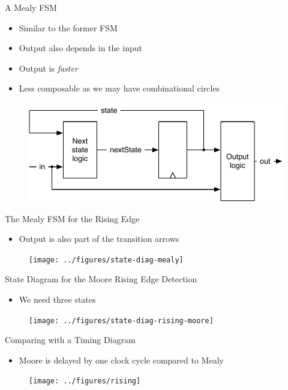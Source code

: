\begin{frame}[fragile]{A Mealy FSM}
\begin{itemize}
\item Similar to the former FSM
\item Output also depends in the input
\item Output is \emph{faster}
\item Less composable as we may have combinational circles
\end{itemize}
\begin{figure}
  \includegraphics[scale=\scale]{../figures/mealy}
\end{figure}
\end{frame}

\begin{frame}[fragile]{The Mealy FSM for the Rising Edge}
\begin{itemize}
\item Output is also part of the transition arrows
\end{itemize}
\begin{figure}
  \texttt{[image: ../figures/state-diag-mealy]}
\end{figure}
\end{frame}

\begin{frame}[fragile]{State Diagram for the Moore Rising Edge Detection}
\begin{itemize}
\item We need three states
\end{itemize}
\begin{figure}
  \texttt{[image: ../figures/state-diag-rising-moore]}
\end{figure}
\end{frame}

\begin{frame}[fragile]{Comparing with a Timing Diagram}
\begin{itemize}
\item Moore is delayed by one clock cycle compared to Mealy
\end{itemize}
\begin{figure}
  \texttt{[image: ../figures/rising]}
\end{figure}
\end{frame}

